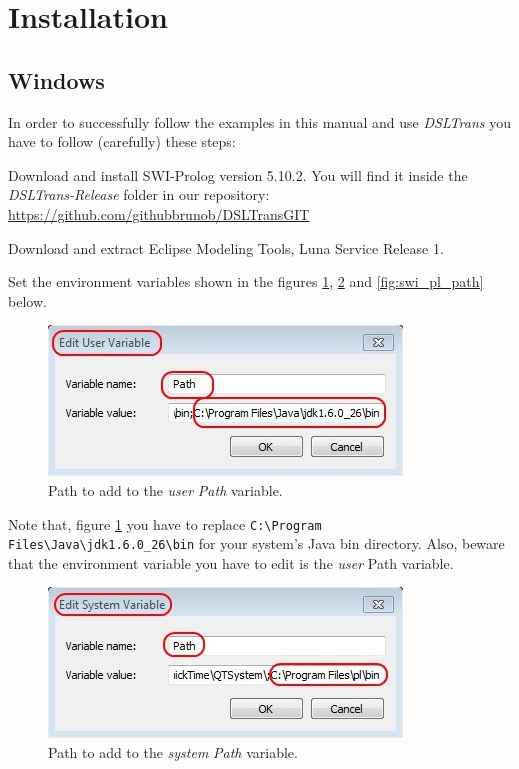 ﻿\section{Installation}
\label{sec:installation}

\subsection{Windows}

In order to successfully follow the examples in this manual and use
\emph{DSLTrans} you have to follow (carefully) these steps:

Download and install SWI-Prolog version 5.10.2. You will find it inside the \emph{DSLTrans-Release} folder in our repository:
\url{https://github.com/githubbrunob/DSLTransGIT}

Download and extract Eclipse Modeling Tools, Luna Service Release 1.

Set the environment variables shown in the figures \ref{fig:path_user}, \ref{fig:path_system} and \ref{fig:swi_pl_path} below.

\begin{figure}[h]
\begin{center}
  \includegraphics[scale=0.9]{imgs/path_user.jpg}
  \caption{Path to add to the \emph{user} \emph{Path} variable.}
  \label{fig:path_user}
\end{center}
\end{figure}

Note that, figure \ref{fig:path_user} you have to replace \verb=C:\Program Files\Java\jdk1.6.0_26\bin=
for your system's Java bin directory. Also, beware that the environment
variable you have to edit is the \emph{user} Path variable.

\begin{figure}[h]
\begin{center}
  \includegraphics[scale=0.9]{imgs/path_system.jpg}
  \caption{Path to add to the \emph{system} \emph{Path} variable.}
  \label{fig:path_system}
\end{center}
\end{figure}

